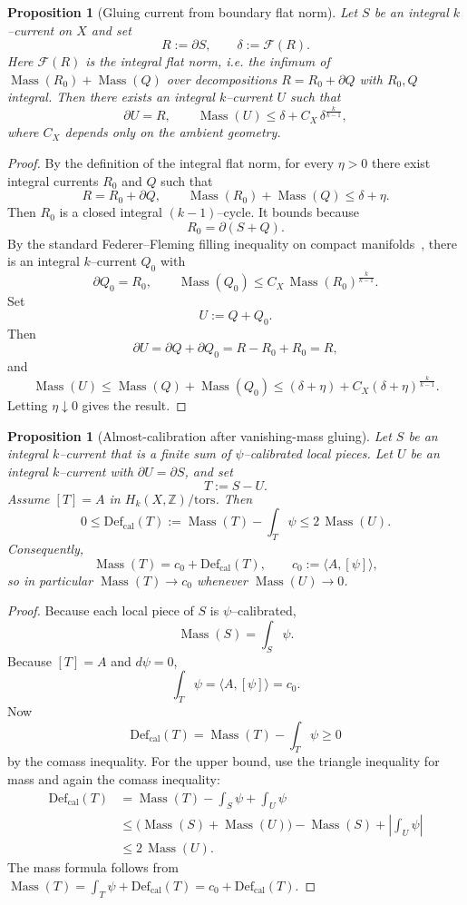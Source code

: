 \documentclass[11pt]{article}
\numberwithin{equation}{section}
\theoremstyle{plain}
\newtheorem{proposition}[theorem]{Proposition}
\theoremstyle{definition}
\theoremstyle{remark}
\DeclareMathOperator{\Mass}{Mass}
\newcommand{\Z}{\mathbb{Z}}
\newcommand{\calF}{\mathcal{F}}
\newcommand{\Defcal}{\mathrm{Def}_{\mathrm{cal}}}
\begin{document}
\begin{proposition}[Gluing current from boundary flat norm]\label{prop:glue}
Let $S$ be an integral $k$--current on $X$ and set
\[
R:=\partial S,
\qquad
\delta:=\calF(R).
\]
Here $\calF(R)$ is the integral flat norm, i.e. the infimum of
$\Mass(R_0)+\Mass(Q)$ over decompositions $R=R_0+\partial Q$ with
$R_0,Q$ integral.  Then there exists an integral $k$--current $U$ such that
\[
\partial U=R,
\qquad
\Mass(U)\le \delta + C_X\,\delta^{\frac{k}{k-1}},
\]
where $C_X$ depends only on the ambient geometry.
\end{proposition}

\begin{proof}
By the definition of the integral flat norm, for every $\eta>0$ there exist integral currents $R_0$ and $Q$ such that
\[
R=R_0+\partial Q,
\qquad
\Mass(R_0)+\Mass(Q)\le \delta+\eta.
\]
Then $R_0$ is a closed integral $(k-1)$--cycle.  It bounds because
\[
R_0=\partial(S+Q).
\]
By the standard Federer--Fleming filling inequality on compact manifolds~\cite{FF60,Fed69}, there is an integral $k$--current $Q_0$ with
\[
\partial Q_0=R_0,
\qquad
\Mass(Q_0)\le C_X\,\Mass(R_0)^{\frac{k}{k-1}}.
\]
Set
\[
U:=Q+Q_0.
\]
Then
\[
\partial U=\partial Q+\partial Q_0=R-R_0+R_0=R,
\]
and
\[
\Mass(U)\le \Mass(Q)+\Mass(Q_0)
\le (\delta+\eta)+C_X(\delta+\eta)^{\frac{k}{k-1}}.
\]
Letting $\eta\downarrow 0$ gives the result.
\end{proof}

\begin{proposition}[Almost-calibration after vanishing-mass gluing]\label{prop:almost}
Let $S$ be an integral $k$--current that is a finite sum of $\psi$--calibrated local pieces.  Let $U$ be an integral $k$--current with $\partial U=\partial S$, and set
\[
T:=S-U.
\]
Assume $[T]=A$ in $H_k(X,\Z)/\mathrm{tors}$.  Then
\[
0\le \Defcal(T):=\Mass(T)-\int_T\psi\le 2\,\Mass(U).
\]
Consequently,
\[
\Mass(T)=c_0+\Defcal(T),
\qquad
c_0:=\langle A,[\psi]\rangle,
\]
so in particular $\Mass(T)\to c_0$ whenever $\Mass(U)\to 0$.
\end{proposition}

\begin{proof}
Because each local piece of $S$ is $\psi$--calibrated,
\[
\Mass(S)=\int_S\psi.
\]
Because $[T]=A$ and $d\psi=0$,
\[
\int_T\psi=\langle A,[\psi]\rangle=c_0.
\]
Now
\[
\Defcal(T)=\Mass(T)-\int_T\psi\ge 0
\]
by the comass inequality.  For the upper bound, use the triangle inequality for mass and again the comass inequality:
\[
\begin{aligned}
\Defcal(T)
&= \Mass(T)-\int_S\psi+\int_U\psi \\
&\le \bigl(\Mass(S)+\Mass(U)\bigr)-\Mass(S)+\left|\int_U\psi\right| \\
&\le 2\,\Mass(U).
\end{aligned}
\]
The mass formula follows from $\Mass(T)=\int_T\psi+\Defcal(T)=c_0+\Defcal(T)$.
\end{proof}
\end{document}
